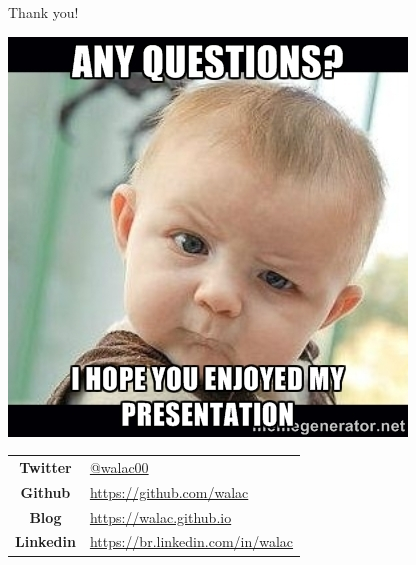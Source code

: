 \documentclass[pdf]{beamer}
\begin{document}
\begin{frame}{Thank you!}
  \begin{center}
    \includegraphics[scale=0.2]{img/questions.jpg}
  \end{center}

  \begin{center}
    \begin{tabular}{c l}
      \textbf{Twitter} & \href{https://twitter.com/walac00}{@walac00} \\
      \textbf{Github} & \url{https://github.com/walac} \\
      \textbf{Blog} & \url{https://walac.github.io} \\
      \textbf{Linkedin} & \url{https://br.linkedin.com/in/walac} \\
    \end{tabular}
  \end{center}

\end{frame}
\end{document}
